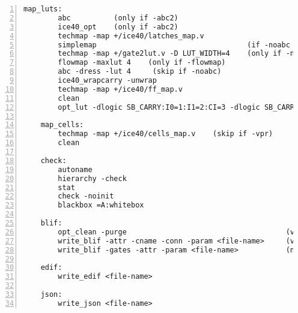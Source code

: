 \begin{lstlisting}[numbers=left,frame=single]
    map_luts:
        abc          (only if -abc2)
        ice40_opt    (only if -abc2)
        techmap -map +/ice40/latches_map.v
        simplemap                                   (if -noabc or -flowmap)
        techmap -map +/gate2lut.v -D LUT_WIDTH=4    (only if -noabc)
        flowmap -maxlut 4    (only if -flowmap)
        abc -dress -lut 4     (skip if -noabc)
        ice40_wrapcarry -unwrap
        techmap -map +/ice40/ff_map.v
        clean
        opt_lut -dlogic SB_CARRY:I0=1:I1=2:CI=3 -dlogic SB_CARRY:CO=3

    map_cells:
        techmap -map +/ice40/cells_map.v    (skip if -vpr)
        clean

    check:
        autoname
        hierarchy -check
        stat
        check -noinit
        blackbox =A:whitebox

    blif:
        opt_clean -purge                                     (vpr mode)
        write_blif -attr -cname -conn -param <file-name>     (vpr mode)
        write_blif -gates -attr -param <file-name>           (non-vpr mode)

    edif:
        write_edif <file-name>

    json:
        write_json <file-name>
\end{lstlisting}

